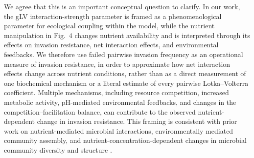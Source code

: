 \responselabel
We agree that this is an important conceptual question to clarify. In our work, the gLV interaction-strength parameter is framed as a phenomenological parameter for ecological coupling within the model, while the nutrient manipulation in Fig.~4 changes nutrient availability and is interpreted through its effects on invasion resistance, net interaction effects, and environmental feedbacks. We therefore use failed pairwise invasion frequency as an operational measure of invasion resistance, in order to approximate how net interaction effects change across nutrient conditions, rather than as a direct measurement of one biochemical mechanism or a literal estimate of every pairwise Lotka--Volterra coefficient. Multiple mechanisms, including resource competition, increased metabolic activity, pH-mediated environmental feedbacks, and changes in the competition--facilitation balance, can contribute to the observed nutrient-dependent change in invasion resistance. This framing is consistent with prior work on nutrient-mediated microbial interactions, environmentally mediated community assembly, and nutrient-concentration-dependent changes in microbial community diversity and structure \citep{Ratzke2018,Ratzke2020,Goldford2018,Estrela2021,DalBello2026,DuanPawar2025}.


